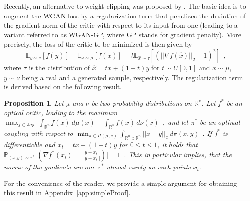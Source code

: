 \documentclass{article} %
\newcommand{\RR}[1][]{\mathbb{R}^{#1}}
\newcommand{\norm}[1]{||{#1}||_2}
\newcommand{\Li}[1]{\mathcal{L}ip_{#1}}
\newcommand{\af}[1]{\textcolor{blue}{#1}}
\newcommand{\hp}[1]{\textcolor{red}{#1}}
\newcommand{\dl}[1]{\textcolor{purple}{#1}}
\newtheorem{proposition}{Proposition}
\begin{document}


Recently, an alternative to weight clipping was proposed by \citet{iWGAN}.
The basic idea is to augment the WGAN loss by a regularization term that penalizes the deviation of the gradient norm of the critic with respect to its input from one (leading to a variant referred to as WGAN-GP, where GP stands for gradient penalty).
More precisely, the loss of the critic to be minimized is then given by
\begin{equation}\label{eq:iWGAN}
\mathbb{E}_{y\sim \nu}[f(y)] -\mathbb{E}_{x\sim \mu}[f(x)]  + \lambda \mathbb{E}_{\hat x \sim \tau}[(||\nabla f(\hat x)||_2 - 1)^2] \enspace, \end{equation} where $\tau$ is the distribution of $\hat x = tx+(1-t)y$ for $t\sim U[0,1]$ and $x\sim\mu$, $y\sim \nu$ being a real and a generated sample, 
respectively. The regularization term is derived based on the following result. 
\begin{proposition}\label{prp:WGan}
Let $\mu$ and $\nu$ be two probability distributions on $\RR[n]$. Let $f^*$ be an optical critic, leading to the maximum 
$
\max_{f \in \Li{1}}  \int_{\RR[n]} f(x)\ d\mu(x)  - \int_{\RR[n]} f(x)\ d\nu(x) \enspace,
$
and let $\pi^*$ be an optimal coupling with respect to
$\min_{\pi \in \Pi(\mu,\nu)}\int_{\RR[n]\times\RR[n]} \norm{x-y}\ d\pi(x,y) \enspace.
$
If $f^*$ is differentiable and $x_t = tx+(1-t)y$ for $0\leq t \leq 1$, it holds that
$
\mathbb{P}_{(x,y)\sim \pi^*} \Big[(\nabla f^*(x_t)=\frac{y-x_t}{||y-x_t||}) \Big]=1 \enspace .
$
This in particular implies, that the norms of the gradients are one $\pi^*$-almost surely on such points $x_t$.
\end{proposition}

For the convenience of the reader, we provide a simple argument for obtaining this result in Appendix~\ref{app:simpleProof}. %
\end{document}
